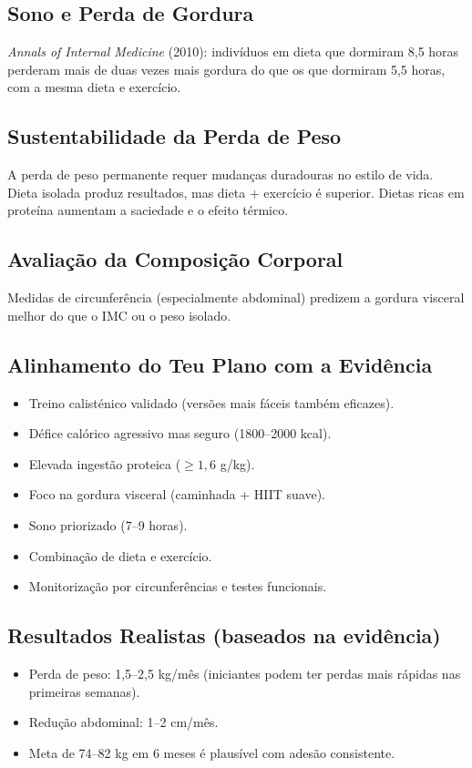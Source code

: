 \documentclass[12pt,a4paper]{scrartcl}
\begin{document}
\subsection{Sono e Perda de Gordura}
\textit{Annals of Internal Medicine} (2010): indivíduos em dieta que dormiram 8,5 horas perderam mais de duas vezes mais gordura do que os que dormiram 5,5 horas, com a mesma dieta e exercício.

\subsection{Sustentabilidade da Perda de Peso}
A perda de peso permanente requer mudanças duradouras no estilo de vida. Dieta isolada produz resultados, mas dieta + exercício é superior. Dietas ricas em proteína aumentam a saciedade e o efeito térmico.

\subsection{Avaliação da Composição Corporal}
Medidas de circunferência (especialmente abdominal) predizem a gordura visceral melhor do que o IMC ou o peso isolado.

\subsection{Alinhamento do Teu Plano com a Evidência}
\begin{itemize}
    \item Treino calisténico validado (versões mais fáceis também eficazes).
    \item Défice calórico agressivo mas seguro (1800–2000 kcal).
    \item Elevada ingestão proteica ($\ge 1,6$ g/kg).
    \item Foco na gordura visceral (caminhada + HIIT suave).
    \item Sono priorizado (7–9 horas).
    \item Combinação de dieta e exercício.
    \item Monitorização por circunferências e testes funcionais.
\end{itemize}

\subsection{Resultados Realistas (baseados na evidência)}
\begin{itemize}
    \item Perda de peso: 1,5–2,5 kg/mês (iniciantes podem ter perdas mais rápidas nas primeiras semanas).
    \item Redução abdominal: 1–2 cm/mês.
    \item Meta de 74–82 kg em 6 meses é plausível com adesão consistente.
\end{itemize}
\end{document}
